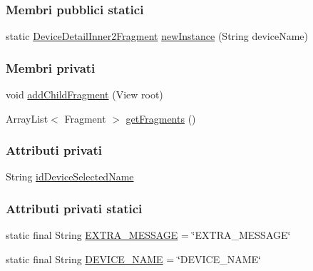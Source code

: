 \subsubsection*{Membri pubblici statici}
\begin{DoxyCompactItemize}
\item 
static \hyperlink{classit_1_1unibo_1_1torsello_1_1bluetoothpositioning_1_1fragment_1_1DeviceDetailInner2Fragment}{Device\+Detail\+Inner2\+Fragment} \hyperlink{classit_1_1unibo_1_1torsello_1_1bluetoothpositioning_1_1fragment_1_1DeviceDetailInner2Fragment_aa925d9adfc96e8228b18330443c52c0d_aa925d9adfc96e8228b18330443c52c0d}{new\+Instance} (String device\+Name)
\end{DoxyCompactItemize}
\subsubsection*{Membri privati}
\begin{DoxyCompactItemize}
\item 
void \hyperlink{classit_1_1unibo_1_1torsello_1_1bluetoothpositioning_1_1fragment_1_1DeviceDetailInner2Fragment_af61900b6821dff2086e86d646c990870_af61900b6821dff2086e86d646c990870}{add\+Child\+Fragment} (View root)
\item 
Array\+List$<$ Fragment $>$ \hyperlink{classit_1_1unibo_1_1torsello_1_1bluetoothpositioning_1_1fragment_1_1DeviceDetailInner2Fragment_a74ebcb936381919cfe4f3542585203c4_a74ebcb936381919cfe4f3542585203c4}{get\+Fragments} ()
\end{DoxyCompactItemize}
\subsubsection*{Attributi privati}
\begin{DoxyCompactItemize}
\item 
String \hyperlink{classit_1_1unibo_1_1torsello_1_1bluetoothpositioning_1_1fragment_1_1DeviceDetailInner2Fragment_a84cd6ba00a3c2e8b7a53cac62c73f1b5_a84cd6ba00a3c2e8b7a53cac62c73f1b5}{id\+Device\+Selected\+Name}
\end{DoxyCompactItemize}
\subsubsection*{Attributi privati statici}
\begin{DoxyCompactItemize}
\item 
static final String \hyperlink{classit_1_1unibo_1_1torsello_1_1bluetoothpositioning_1_1fragment_1_1DeviceDetailInner2Fragment_a5093b051b0d458a870b6eef51b088e7d_a5093b051b0d458a870b6eef51b088e7d}{E\+X\+T\+R\+A\+\_\+\+M\+E\+S\+S\+A\+GE} = \char`\"{}E\+X\+T\+R\+A\+\_\+\+M\+E\+S\+S\+A\+GE\char`\"{}
\item 
static final String \hyperlink{classit_1_1unibo_1_1torsello_1_1bluetoothpositioning_1_1fragment_1_1DeviceDetailInner2Fragment_aa28d537983d4cf578120a9c51eb2b0bb_aa28d537983d4cf578120a9c51eb2b0bb}{D\+E\+V\+I\+C\+E\+\_\+\+N\+A\+ME} = \char`\"{}D\+E\+V\+I\+C\+E\+\_\+\+N\+A\+ME\char`\"{}
\end{DoxyCompactItemize}


